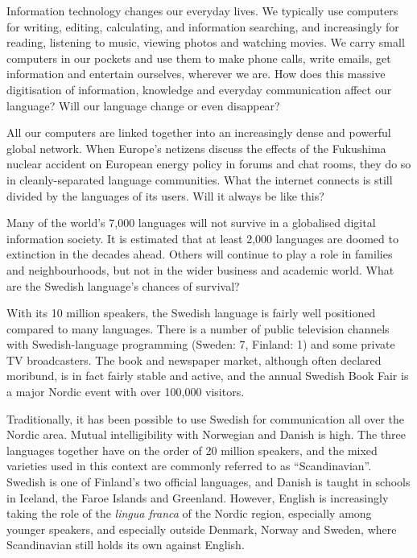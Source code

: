 \begin{multicols}{2}

Information technology changes our everyday lives. We typically use
computers for writing, editing, calculating, and information
searching, and increasingly for reading, listening to music, viewing
photos and watching movies. We carry small computers in our pockets
and use them to make phone calls, write emails, get information and
entertain ourselves, wherever we are. How does this massive
digitisation of information, knowledge and everyday communication
affect our language? Will our language change or even disappear?


All our computers are linked together into an increasingly dense and
powerful global network. When Europe's netizens discuss the effects of
the Fukushima nuclear accident on European energy policy in forums and
chat rooms, they do so in cleanly-separated language communities. What
the internet connects is still divided by the languages of its
users. Will it always be like this?

Many of the world’s 7,000 languages will not survive in a globalised
digital information society. It is estimated that at least 2,000
languages are doomed to extinction in the decades ahead. Others will
continue to play a role in families and neighbourhoods, but not in the
wider business and academic world. What are the Swedish language’s
chances of survival?

With its 10 million speakers, the Swedish lang\-uage is fairly well
positioned compared to many lang\-uages. There is a number of public
tele\-vision \mbox{channels} with Swedish-language programming (Sweden: 7,
Finland: 1) and some private TV broadcasters. The book and newspaper
market, although often declared moribund, is in fact fairly \mbox{stable} and
active, and the annual Swedish Book Fair is a major Nordic event with
over 100,000 visitors.

Traditionally, it has been possible to use Swedish for communication
all over the Nordic area. \mbox{Mutual} intelligibility with Norwegian
and \mbox{Danish} is high. The three languages together have on the
order of 20 million speakers, and the mixed varieties used in this
context are commonly referred to as ``Scandinavian''. Swedish is one
of Finland's two official languages, and \mbox{Danish} is taught in
schools in Iceland, the Faroe \mbox{Islands} and Greenland. However,
English is increasingly taking the role of the \emph{lingua franca} of
the Nordic \mbox{region}, especially among younger speakers, and
especially outside Denmark, Norway and \mbox{Sweden}, where
Scandinavian still holds its own against \mbox{English}.


\end{multicols}
